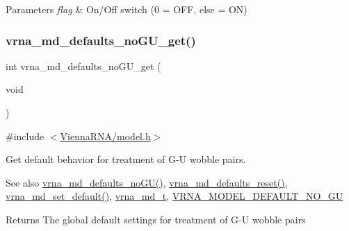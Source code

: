 \begin{DoxyParams}{Parameters}
{\em flag} & On/\+Off switch (0 = O\+FF, else = ON) \\
\hline
\end{DoxyParams}
\mbox{\label{group__model__details_ga5faa7d4e536d7fe36ec25428c0cf2563}} 
\subsubsection{\texorpdfstring{vrna\+\_\+md\+\_\+defaults\+\_\+no\+G\+U\+\_\+get()}{vrna\_md\_defaults\_noGU\_get()}}
{\footnotesize\ttfamily int vrna\+\_\+md\+\_\+defaults\+\_\+no\+G\+U\+\_\+get (\begin{DoxyParamCaption}\item[{void}]{ }\end{DoxyParamCaption})}



{\ttfamily \#include $<$\hyperlink{model_8h}{Vienna\+R\+N\+A/model.\+h}$>$}



Get default behavior for treatment of G-\/U wobble pairs. 

\begin{DoxySeeAlso}{See also}
\hyperlink{group__model__details_ga98218f85c7a957a1d1ddf4627fdf5a39}{vrna\+\_\+md\+\_\+defaults\+\_\+no\+G\+U()}, \hyperlink{group__model__details_ga70834424cf804d149937de89f80ceb45}{vrna\+\_\+md\+\_\+defaults\+\_\+reset()}, \hyperlink{group__model__details_ga8ac6ff84936282436f822644bf841f66}{vrna\+\_\+md\+\_\+set\+\_\+default()}, \hyperlink{group__model__details_ga1f8a10e12a0a1915f2a4eff0b28ea17c}{vrna\+\_\+md\+\_\+t}, \hyperlink{group__model__details_ga34702f7d14d38b877ba8e475281e97e2}{V\+R\+N\+A\+\_\+\+M\+O\+D\+E\+L\+\_\+\+D\+E\+F\+A\+U\+L\+T\+\_\+\+N\+O\+\_\+\+GU} 
\end{DoxySeeAlso}
\begin{DoxyReturn}{Returns}
The global default settings for treatment of G-\/U wobble pairs 
\end{DoxyReturn}
\mbox{\label{group__model__details_gade5b9951d71ca2fb357a4e6c0c18ccd1}} 
